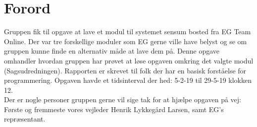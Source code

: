 \chapter{Forord}
Gruppen fik til opgave at lave et modul til systemet sensum bosted fra EG Team Online. Der var tre forskellige moduler som EG gerne ville have belyst og se om gruppen kunne finde en alternativ måde at lave dem på. Denne opgave omhandler hvordan gruppen har prøvet at løse opgaven omkring det valgte modul (Sagsudredningen). Rapporten er skrevet til folk der har en basisk forståelse for programmering. Opgaven havde et tidsinterval der hed: 5-2-19 til 29-5-19 klokken 12. \\
Der er nogle personer gruppen gerne vil sige tak for at hjælpe opgaven på vej:\\
Første og fremmeste vores vejleder Henrik Lykkegård Larsen, samt EG’s repræsentant.  \\
